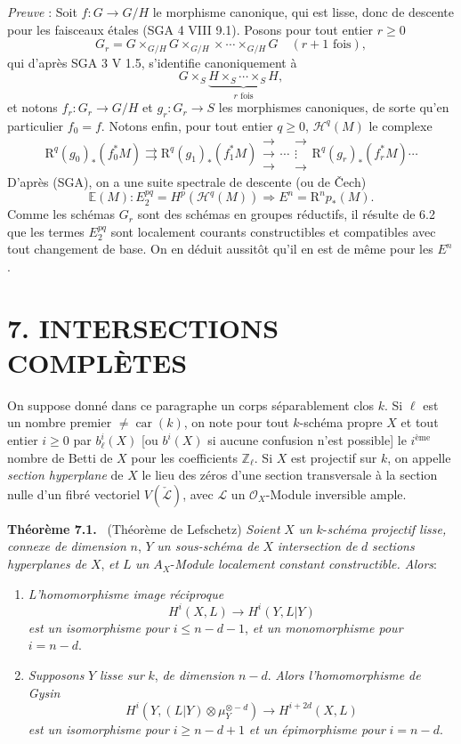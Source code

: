 \documentclass[11pt]{article}
\newenvironment{statement}[1]{\par\medskip\noindent\textbf{#1.}\ }{\par\medskip}
\begin{document}
\emph{Preuve} : Soit $f:G\to G/H$ le morphisme canonique, qui est lisse, donc de descente pour les faisceaux étales (SGA 4 VIII 9.1). Posons pour tout entier $r\ge0$
\[
G_r=G\times_{G/H}G\times_{G/H}\times\cdots\times_{G/H}G
\quad(r+1\text{ fois}),
\]
qui d'après SGA 3 V 1.5, s'identifie canoniquement à
\[
G\times_S\underbrace{H\times_S\cdots\times_S H}_{r\text{ fois}},
\]
et notons $f_r:G_r\to G/H$ et $g_r:G_r\to S$ les morphismes canoniques, de sorte qu'en particulier $f_0=f$. Notons enfin, pour tout entier $q\ge0$, $\mathcal H^q(M)$ le complexe
\[
\mathrm{R}^q(g_0)_*(f_0^*M)\rightrightarrows \mathrm{R}^q(g_1)_*(f_1^*M)\mathrel{\substack{\to\\\to\\\to}}\cdots\mathrel{\substack{\to\\\vdots\\\to}} \mathrm{R}^q(g_r)_*(f_r^*M)\cdots
\]
D'après (SGA), on a une suite spectrale de descente (ou de Čech)
\[
\mathbb E(M):E_2^{pq}=H^p(\mathcal H^q(M))\Rightarrow E^n=\mathrm{R}^np_*(M).
\]
Comme les schémas $G_r$ sont des schémas en groupes réductifs, il résulte de 6.2 que les termes $E_2^{pq}$ sont localement courants constructibles et compatibles avec tout changement de base. On en déduit aussitôt qu'il en est de même pour les $E^n$.

\section*{7. INTERSECTIONS COMPLÈTES}

On suppose donné dans ce paragraphe un corps séparablement clos $k$. Si $\ell$ est un nombre premier $\ne\operatorname{car}(k)$, on note pour tout $k$-schéma propre $X$ et tout entier $i\ge0$ par
$b_\ell^i(X)$ [ou $b^i(X)$ si aucune confusion n'est possible] le $i^{\text{ème}}$ nombre de Betti de $X$ pour les coefficients $\mathbb Z_\ell$. Si $X$ est projectif sur $k$, on appelle \emph{section hyperplane} de $X$ le lieu des zéros d'une section transversale à la section nulle d'un fibré vectoriel $V(\check{\mathcal L})$, avec $\mathcal L$ un $\mathcal O_X$-Module inversible ample.

\begin{statement}{Théorème 7.1}
(Théorème de Lefschetz) \emph{Soient} $X$ \emph{un} $k$-\emph{schéma projectif lisse, connexe de dimension} $n$, $Y$ \emph{un sous-schéma de} $X$ \emph{intersection de} $d$ \emph{sections hyperplanes de} $X$, \emph{et} $L$ \emph{un} $A_X$-\emph{Module localement constant constructible. Alors}:
\begin{enumerate}[label=(\roman*)]
\item \emph{L'homomorphisme image réciproque}
\[
H^i(X,L)\to H^i(Y,L|Y)
\]
\emph{est un isomorphisme pour} $i\le n-d-1$, \emph{et un monomorphisme pour} $i=n-d$.
\item \emph{Supposons} $Y$ \emph{lisse sur} $k$, \emph{de dimension} $n-d$. \emph{Alors l'homomorphisme de Gysin}
\[
H^i(Y,(L|Y)\otimes\mu_Y^{\otimes -d})\to H^{i+2d}(X,L)
\]
\emph{est un isomorphisme pour} $i\ge n-d+1$ \emph{et un épimorphisme pour} $i=n-d$.
\end{enumerate}
\end{statement}
\end{document}
